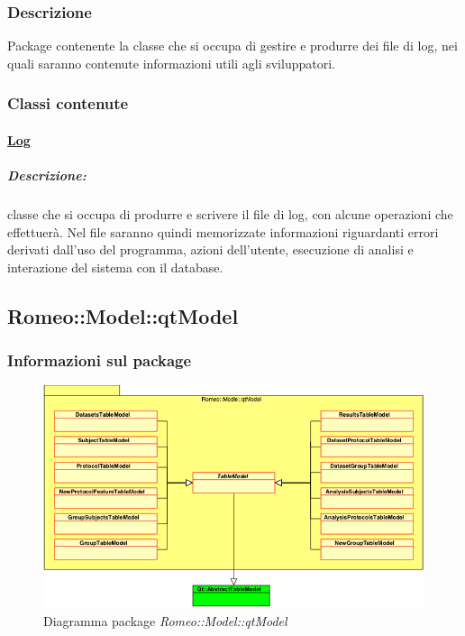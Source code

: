 		\subsubsection{Descrizione}
		\label{descr_log}
		Package\g{} contenente la classe che si occupa di gestire e produrre dei file di log, nei quali saranno contenute informazioni utili agli sviluppatori.
		
		\subsubsection{Classi contenute}
		
		\paragraph{\underline{Log}}
		\label{log_class}
			\subparagraph{Descrizione:} classe che si occupa di produrre e scrivere il file di log, con alcune operazioni che \project{} effettuerà. Nel file saranno quindi memorizzate informazioni riguardanti errori derivati dall'uso del programma, azioni dell'utente, esecuzione di analisi e interazione del sistema con il database. 		
			\pagebreak
			
		
		\subsection{Romeo::Model::qtModel}
			\label{romeo::model::qtmodel}
				\subsubsection{Informazioni sul package}
				\label{qtmodel_info}
				\begin{figure}[!h]
					\centering
					\includegraphics[width=\linewidth]{./Content/Immagini/Romeo__Model__qtModel.png}
					\caption{Diagramma package \textsl{Romeo::Model::qtModel}}
					\label{comp_qtModel}
				\end{figure}
